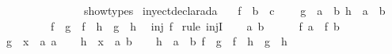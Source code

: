 \begin{isabellebody}
\ \ \ \ \ \ \isamarkupfalse%
\isanewline
\ \ \ \ \isamarkupfalse%
\isanewline
\ \ \isamarkupfalse%
\isanewline
{}\isamarkupfalse%
%
\endisatagproof
{\isafoldproof}%
%
\isadelimproof
\isanewline
%
\endisadelimproof
\isanewline
{}\isamarkupfalse%
\ {\isacharbrackleft}{\isacharbrackleft}show{\isacharunderscore}types{\isacharbrackright}{\isacharbrackright}\isanewline
\isanewline
{}\isamarkupfalse%
\ inyectdeclarada{}{\isacharcolon}\isanewline
\ \ \ f\ {\isacharcolon}{\isacharcolon}\ {\isachardoublequoteopen}{\isacharprime}b\ {\isasymRightarrow}\ {\isacharprime}c{\isachardoublequoteclose}\ \isanewline
\ \ \ {\isachardoublequoteopen}{\isasymforall}{\isacharparenleft}g\ {\isacharcolon}{\isacharcolon}\ {\isacharprime}a\ {\isasymRightarrow}\ {\isacharprime}b{\isacharparenright}\ {\isacharparenleft}h\ {\isacharcolon}{\isacharcolon}\ {\isacharprime}a\ {\isasymRightarrow}\ {\isacharprime}b{\isacharparenright}{\isachardot}\isanewline
\ \ \ \ \ \ \ \ \ {\isacharparenleft}f\ {\isasymcirc}\ g\ {\isacharequal}\ f\ {\isasymcirc}\ h\ {\isasymlongrightarrow}\ g\ {\isacharequal}\ h{\isacharparenright}{\isachardoublequoteclose}\isanewline
{}\ {\isachardoublequoteopen}\ inj\ f{\isachardoublequoteclose}\isanewline
%
\isadelimproof
%
\endisadelimproof
%
\isatagproof
{}\isamarkupfalse%
\ {\isacharparenleft}rule\ injI{\isacharparenright}\isanewline
\ \ \isamarkupfalse%
\ a\ b\ \isanewline
\ \ \isamarkupfalse%
\ {}{\isacharcolon}\ {\isachardoublequoteopen}f\ a\ {\isacharequal}\ f\ b\ {\isachardoublequoteclose}\isanewline
\ \ \isamarkupfalse%
\ {\isacharquery}g\ {\isacharequal}\ {\isachardoublequoteopen}{\isasymlambda}x\ {\isacharcolon}{\isacharcolon}\ {\isacharprime}a{\isachardot}\ a{\isachardoublequoteclose}\isanewline
\ \ \isamarkupfalse%
\ {\isacharquery}h\ {\isacharequal}\ {\isachardoublequoteopen}{\isasymlambda}x\ {\isacharcolon}{\isacharcolon}\ {\isacharprime}a{\isachardot}\ b{\isachardoublequoteclose}\isanewline
\ \ \isamarkupfalse%
\ {\isachardoublequoteopen}{\isasymforall}{\isacharparenleft}h\ {\isacharcolon}{\isacharcolon}\ {\isacharprime}a\ {\isasymRightarrow}\ {\isacharprime}b{\isacharparenright}{\isachardot}\ {\isacharparenleft}f\ {\isasymcirc}\ {\isacharquery}g\ {\isacharequal}\ f\ {\isasymcirc}\ h\ {\isasymlongrightarrow}\ {\isacharquery}g\ {\isacharequal}\ h{\isacharparenright}{\isachardoublequoteclose}\isanewline

\end{isabellebody}

